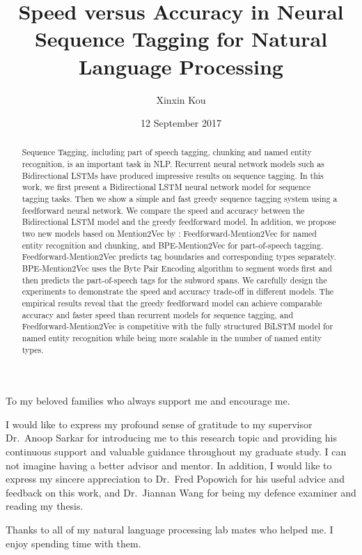 \documentclass{sfuthesis}
\title{Speed versus Accuracy in Neural Sequence Tagging for Natural Language Processing}
\author{Xinxin Kou}
\date{12 September 2017}
\newcommand{\ma}{Feedforward-Mention2Vec}
\newcommand{\mb}{BPE-Mention2Vec}
\begin{document}
\frontmatter
\maketitle{}
\makecommittee{}


\begin{abstract}
Sequence Tagging, including part of speech tagging, chunking and named entity recognition, is an important task in NLP. Recurrent neural network models such as Bidirectional LSTMs have produced impressive results on sequence tagging. In this work, we first present a Bidirectional LSTM neural network model for sequence tagging tasks. Then we show a simple and fast greedy sequence tagging system using a feedforward neural network. We compare the speed and accuracy between the Bidirectional LSTM model and the greedy feedforward model. In addition, we propose two new models based on Mention2Vec by \cite{stratos2016mention2vec}: \ma{} for named entity recognition and chunking, and \mb{} for part-of-speech tagging. \ma{} predicts tag boundaries and corresponding types separately. \mb{} uses the Byte Pair Encoding algorithm to segment words first and then predicts the part-of-speech tags for the subword spans. We carefully design the experiments to demonstrate the speed and accuracy trade-off in different models. The empirical results reveal that the greedy feedforward model can achieve comparable accuracy and faster speed than recurrent models for sequence tagging, and \ma{} is competitive with the fully structured BiLSTM model for named entity recognition while being more scalable in the number of named entity types.

\end{abstract}

\begin{dedication} %

To my beloved families who always support me and encourage me. 

\end{dedication}

\begin{acknowledgements} %

I would like to express my profound sense of gratitude to my supervisor Dr.\ Anoop Sarkar for introducing me to this research topic and providing his continuous support and valuable guidance throughout my graduate study. I can not imagine having a better advisor and mentor. In addition, I would like to express my sincere appreciation to Dr.\ Fred Popowich for his useful advice and feedback on this work, and Dr.\ Jiannan Wang for being my defence examiner and reading my thesis.

Thanks to all of my natural language processing lab mates who helped me. I enjoy spending time with them. 


\end{acknowledgements}
\end{document}

